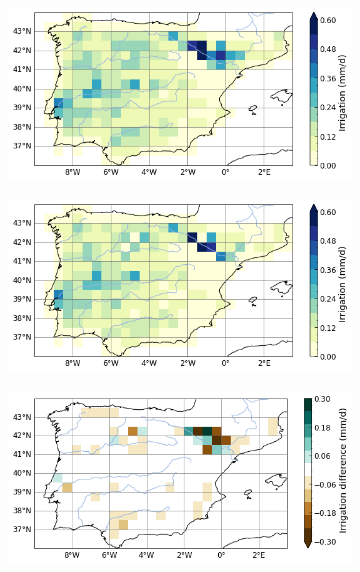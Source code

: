 \begin{figure}[htbp]
    \centering
    \begin{subfigure}[b]{0.32\textwidth}
        \caption{}
        \includegraphics[width=\linewidth]{images/eval_halfdeg/maps/irrigation_subgrid.png}
    \end{subfigure}
    \begin{subfigure}[b]{0.32\textwidth}
        \caption{}
        \includegraphics[width=\linewidth]{images/eval_halfdeg/maps/irrigation_interp.png}
    \end{subfigure}
    \begin{subfigure}[b]{0.32\textwidth}
        \caption{}
        \includegraphics[width=\linewidth]{images/eval_halfdeg/maps/irrigation_diff.png}
    \end{subfigure} \\


\end{figure}
